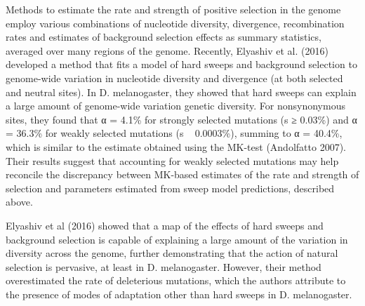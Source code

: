 	Methods to estimate the rate and strength of positive selection in the genome employ various combinations of nucleotide diversity, divergence, recombination rates and estimates of background selection effects as summary statistics, averaged over many regions of the genome. Recently, Elyashiv et al. (2016) developed a method that fits a model of hard sweeps and background selection to genome-wide variation in nucleotide diversity and divergence (at both selected and neutral sites). In D. melanogaster, they showed that hard sweeps can explain a large amount of genome-wide variation genetic diversity. For nonsynonymous sites, they found that α = 4.1\% for strongly selected mutations (s ≥ 0.03\%) and α = 36.3\% for weakly selected mutations (s ~ 0.0003\%), summing to α = 40.4\%, which is similar to the estimate obtained using the MK-test (Andolfatto 2007). Their results suggest that accounting for weakly selected mutations may help reconcile the discrepancy between MK-based estimates of the rate and strength of selection and parameters estimated from sweep model predictions, described above.

Elyashiv et al (2016) showed that a map of the effects of hard sweeps and background selection is capable of explaining a large amount of the variation in diversity across the genome, further demonstrating that the action of natural selection is pervasive, at least in D. melanogaster. However, their method overestimated the rate of deleterious mutations, which the authors attribute to the presence of modes of adaptation other than hard sweeps in D. melanogaster. 
